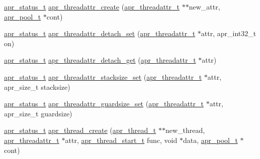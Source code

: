 \begin{DoxyCompactItemize}
\item 
\hyperlink{group__apr__errno_gaf76ee4543247e9fb3f3546203e590a6c}{apr\-\_\-status\-\_\-t} \hyperlink{group__apr__thread__proc_ga66c2f55e5dff9ac37bd32e9febd38da5}{apr\-\_\-threadattr\-\_\-create} (\hyperlink{group__apr__thread__proc_ga35de571e9944871c10b38d8feef885ac}{apr\-\_\-threadattr\-\_\-t} $\ast$$\ast$new\-\_\-attr, \hyperlink{group__apr__pools_gaf137f28edcf9a086cd6bc36c20d7cdfb}{apr\-\_\-pool\-\_\-t} $\ast$cont)
\item 
\hyperlink{group__apr__errno_gaf76ee4543247e9fb3f3546203e590a6c}{apr\-\_\-status\-\_\-t} \hyperlink{group__apr__thread__proc_ga85d44b3b021f28116122d5e40e024648}{apr\-\_\-threadattr\-\_\-detach\-\_\-set} (\hyperlink{group__apr__thread__proc_ga35de571e9944871c10b38d8feef885ac}{apr\-\_\-threadattr\-\_\-t} $\ast$attr, apr\-\_\-int32\-\_\-t on)
\item 
\hyperlink{group__apr__errno_gaf76ee4543247e9fb3f3546203e590a6c}{apr\-\_\-status\-\_\-t} \hyperlink{group__apr__thread__proc_gae5b7cdb3de542d1b7b52fe5d9d8cb00b}{apr\-\_\-threadattr\-\_\-detach\-\_\-get} (\hyperlink{group__apr__thread__proc_ga35de571e9944871c10b38d8feef885ac}{apr\-\_\-threadattr\-\_\-t} $\ast$attr)
\item 
\hyperlink{group__apr__errno_gaf76ee4543247e9fb3f3546203e590a6c}{apr\-\_\-status\-\_\-t} \hyperlink{group__apr__thread__proc_ga7849e0d637338a18cb44f66f11f28ed1}{apr\-\_\-threadattr\-\_\-stacksize\-\_\-set} (\hyperlink{group__apr__thread__proc_ga35de571e9944871c10b38d8feef885ac}{apr\-\_\-threadattr\-\_\-t} $\ast$attr, apr\-\_\-size\-\_\-t stacksize)
\item 
\hyperlink{group__apr__errno_gaf76ee4543247e9fb3f3546203e590a6c}{apr\-\_\-status\-\_\-t} \hyperlink{group__apr__thread__proc_ga2e732f2913291180c0c484f57d727140}{apr\-\_\-threadattr\-\_\-guardsize\-\_\-set} (\hyperlink{group__apr__thread__proc_ga35de571e9944871c10b38d8feef885ac}{apr\-\_\-threadattr\-\_\-t} $\ast$attr, apr\-\_\-size\-\_\-t guardsize)
\item 
\hyperlink{group__apr__errno_gaf76ee4543247e9fb3f3546203e590a6c}{apr\-\_\-status\-\_\-t} \hyperlink{group__apr__thread__proc_gaeba6593f43f1de94c2b4495dd72b0e9f}{apr\-\_\-thread\-\_\-create} (\hyperlink{group__apr__thread__proc_ga646c71351e723d84f8cc8c8d1d5937be}{apr\-\_\-thread\-\_\-t} $\ast$$\ast$new\-\_\-thread, \hyperlink{group__apr__thread__proc_ga35de571e9944871c10b38d8feef885ac}{apr\-\_\-threadattr\-\_\-t} $\ast$attr, \hyperlink{group__apr__thread__proc_ga37193850d158ca870fc8f8759f0725a9}{apr\-\_\-thread\-\_\-start\-\_\-t} func, void $\ast$data, \hyperlink{group__apr__pools_gaf137f28edcf9a086cd6bc36c20d7cdfb}{apr\-\_\-pool\-\_\-t} $\ast$cont)

\end{DoxyCompactItemize}

